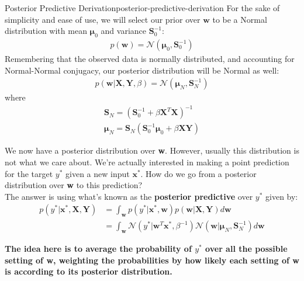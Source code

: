 \begin{derivation}{Posterior Predictive Derivation}{posterior-predictive-derivation}
    For the sake of simplicity and ease of use, we will select our prior over $\textbf{w}$ to be a Normal distribution with mean $\boldsymbol{\mu}_{0}$ and variance $\boldsymbol{S}_{0}^{-1}$:
    \begin{align*}
        p(\textbf{w}) = \mathcal{N}(\boldsymbol{\mu}_{0}, \boldsymbol{S}_{0}^{-1})
    \end{align*}
    Remembering that the observed data is normally distributed, and accounting for Normal-Normal conjugacy, our posterior distribution will be Normal as well:
    \begin{align*}
        p(\textbf{w}|\textbf{X},\textbf{Y}, \beta) = \mathcal{N}(\boldsymbol{\mu}_{N}, \boldsymbol{S}_{N}^{-1})
    \end{align*}
    where
    \begin{align*}
        \boldsymbol{S}_{N} = (\boldsymbol{S}_{0}^{-1} + \beta\textbf{X}^{T}\textbf{X})^{-1} \\
        \boldsymbol{\mu}_{N} = \boldsymbol{S}_{N}(\boldsymbol{S}_{0}^{-1}\boldsymbol{\mu}_{0} + \beta\textbf{X}\textbf{Y})
    \end{align*}

    We now have a posterior distribution over \textbf{w}. However, usually this distribution is not what we care about. We're actually interested in making a point prediction for the target $y^{*}$ given a new input $\textbf{x}^{*}$. How do we go from a posterior distribution over \textbf{w} to this prediction? \\

    The answer is using what's known as the \textbf{posterior predictive} over $y^{*}$ given by:
    \begin{equation}
    \begin{split}
        p(y^{*} | \textbf{x}^{*}, \textbf{X}, \textbf{Y}) &= \int_{\textbf{w}} p(y^{*} | \textbf{x}^{*}, \textbf{w})p(\textbf{w} | \textbf{X}, \textbf{Y})d\textbf{w} \\
        &= \int_{\textbf{w}} \mathcal{N}(y^{*} | \textbf{w}^{T}\textbf{x}^{*}, \beta^{-1})\mathcal{N}(\textbf{w} | \boldsymbol{\mu}_{N}, \boldsymbol{S}_{N}^{-1})d\textbf{w}
    \end{split}
    \end{equation}
\end{derivation}

\textbf{The idea here is to average the probability of $y^{*}$ over all the possible setting of \textbf{w}, weighting the probabilities by how likely each setting of \textbf{w} is according to its posterior distribution.}

